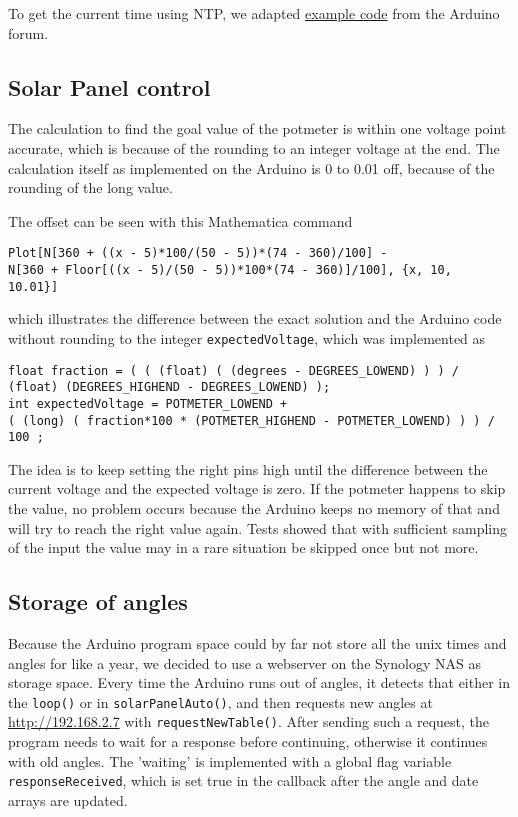 \documentclass{article}
\begin{document}
			To get the current time using NTP, we adapted \href{http://forum.arduino.cc/index.php?topic=171941.0}{example code} from the Arduino forum.

		\subsection{Solar Panel control}
			The calculation to find the goal value of the potmeter is within one voltage point accurate, which is because of the rounding to an integer voltage at the end. The calculation itself as implemented on the Arduino is 0 to 0.01 off, because of the rounding of the long value.
			
			 The offset can be seen with this Mathematica command
			\begin{lstlisting}
Plot[N[360 + ((x - 5)*100/(50 - 5))*(74 - 360)/100] - 
N[360 + Floor[((x - 5)/(50 - 5))*100*(74 - 360)]/100], {x, 10, 
10.01}]
			\end{lstlisting}
			which illustrates the difference between the exact solution and the Arduino code without rounding to the integer \verb|expectedVoltage|, which was implemented as 
			\begin{lstlisting}
float fraction = ( ( (float) ( (degrees - DEGREES_LOWEND) ) ) / (float) (DEGREES_HIGHEND - DEGREES_LOWEND) );
int expectedVoltage = POTMETER_LOWEND +
( (long) ( fraction*100 * (POTMETER_HIGHEND - POTMETER_LOWEND) ) ) / 100 ;
			\end{lstlisting}
			The idea is to keep setting the right pins high until the difference between the current voltage and the expected voltage is zero. If the potmeter happens to skip the value, no problem occurs because the Arduino keeps no memory of that and will try to reach the right value again. Tests showed that with sufficient sampling of the input the value may in a rare situation be skipped once but not more.
			
		\subsection{Storage of angles}
			Because the Arduino program space could by far not store all the unix times and angles for like a year, we decided to use a webserver on the Synology NAS as storage space. Every time the Arduino runs out of angles, it detects that either in the \verb|loop()| or in \verb|solarPanelAuto()|, and then requests new angles at \url{http://192.168.2.7} with \verb|requestNewTable()|. After sending such a request, the program needs to wait for a response before continuing, otherwise it continues with old angles. The 'waiting' is implemented with a global flag variable \verb|responseReceived|, which is set true in the callback after the angle and date arrays are updated. 
			
\end{document}
